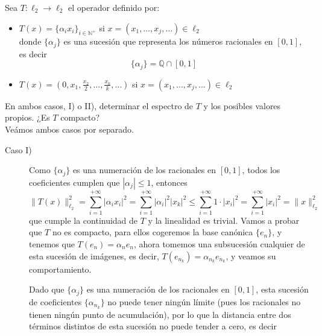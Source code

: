 \begin{ejercicio} %
    Sea $T: \ell_2 \longrightarrow \ell_2$ el operador definido por:
    \begin{itemize}
        \item[(I)] $T(x) = \{\alpha_i x_i\}_{i \in \mathbb{N}^+}$ \quad si $x = (x_1, \dots, x_j, \dots) \in \ell_2$ \\
        donde $\{\alpha_j\}$ es una sucesión que representa los números racionales en $[0,1]$, es decir 
        $$\{\alpha_j\} = \mathbb{Q} \cap [0,1]$$
        
        \item[(II)] $T(x) = \left( 0, x_1, \frac{x_2}{2}, \dots, \frac{x_k}{k}, \dots \right)$ \quad si $x = (x_1, \dots, x_j, \dots) \in \ell_2$
    \end{itemize}
    En ambos casos, I) o II), determinar el espectro de $T$ y los posibles valores propios. ¿Es $T$ compacto? \\

    \noindent
    Veámos ambos casos por separado.
    \begin{description}
        \item[Caso I)] Como $\{\alpha_j\}$ es una numeración de los racionales en $[0,1]$, todos los coeficientes cumplen que $|\alpha_j| \le 1$, entonces
        \begin{equation*}
            \|T(x)\|_{\ell_2}^2 = \sum_{i=1}^{+\infty} |\alpha_i x_i|^2 = \sum_{i=1}^{+\infty} |\alpha_i|^2 |x_k|^2 \le \sum_{i=1}^{+\infty} 1 \cdot |x_i|^2 = \sum_{i=1}^{+\infty} |x_i|^2=\|x\|_{\ell_2}^2
        \end{equation*}
        que cumple la continuidad de $T$ y la linealidad es trivial. Vamos a probar que $T$ no es compacto, para ellos cogeremos la base canónica $\{e_n\}$, y tenemos que $T(e_n) = \alpha_n e_n$, ahora tomemos una subsucesión cualquier de esta sucesión de imágenes, es decir, $T(e_{n_k}) = \alpha_{n_k} e_{n_k}$, y veamos su comportamiento. 
        
        Dado que $\{\alpha_j\}$ es una numeración de los racionales en $[0,1]$, esta sucesión de coeficientes $\{\alpha_{n_k}\}$ no puede tener ningún límite (pues los racionales no tienen ningún punto de acumulación), por lo que la distancia entre dos términos distintos de esta sucesión no puede tender a cero, es decir
    \end{description}
\end{ejercicio}

